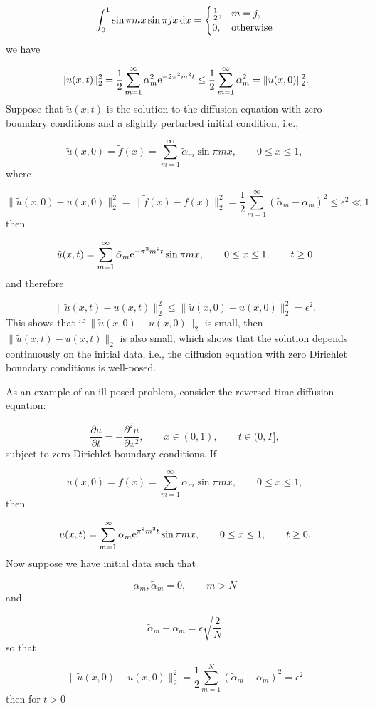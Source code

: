 \documentclass[12pt,landscape]{article}
\begin{document}
{\[
\int_0^1 \sin \pi m x \sin \pi j x\, {\rm d}x = \begin{cases}
\frac{1}{2}, & m  = j, \\
0, & \text{otherwise}
\end{cases}
\]
we have

\[
\|u(x,t)\|_2^2 =  \frac{1}{2}\sum_{m=1}^{\infty} \alpha_m^2 {\rm e}^{-2\pi^2 m^2 t} \leq \frac{1}{2}\sum_{m=1}^{\infty} \alpha_m^2 = \| u(x,0) \|_2^2.
\]
Suppose that $\tilde{u}(x,t)$ is the solution to the diffusion equation with zero boundary conditions and a slightly perturbed initial condition, i.e.,

\[
\tilde{u}(x,0) = \tilde{f}(x) = \sum_{m = 1}^{\infty}\tilde{\alpha}_m \sin \pi m x, \qquad 0 \leq x \leq 1,
\]
where

\[
\| \tilde{u}(x,0) - u(x,0) \|_2^2 = \| \tilde{f}(x) - f(x) \|_2^2 = \frac{1}{2}\sum_{m=1}^{\infty} \left(  \tilde{\alpha}_m -    \alpha_m  \right)^2   \leq \epsilon^2 \ll 1
\]
then

\[
\tilde{u}(x,t) = \sum_{m = 1}^{\infty}\tilde{\alpha}_m {\rm e}^{-\pi^2m^2 t} \sin \pi m x, \qquad 0 \leq x \leq 1, \qquad t \geq 0
\]
and therefore

\[
\|\tilde{u}(x,t) - u(x,t)\|_2^2   \leq  \| \tilde{u}(x,0) -  u(x,0) \|_2^2 = \epsilon^2.
\]
This shows that if $\| \tilde{u}(x,0) -  u(x,0) \|_2$ is small, then $\|\tilde{u}(x,t) - u(x,t)\|_2$ is also small, which shows that the solution depends continuously on the initial data, i.e., the diffusion equation with zero Dirichlet boundary conditions is well-posed.

As an example of an ill-posed problem, consider the reversed-time diffusion equation:

\[
\frac{\partial u}{\partial t}=-\frac{\partial^2 u}{\partial x^2}, \qquad x \in (0, 1),\qquad t \in (0, T],
\]
subject to zero Dirichlet boundary conditions. If

\[
u(x,0) = f(x) = \sum_{m = 1}^{\infty}\alpha_m \sin \pi m x, \qquad 0 \leq x \leq 1,
\]
then

\[
u(x,t) = \sum_{m = 1}^{\infty}\alpha_m {\rm e}^{\pi^2m^2 t} \sin \pi m x, \qquad 0 \leq x \leq 1, \qquad t \geq 0.
\]
Now suppose we have initial data such that

\[
\alpha_m, \tilde{\alpha}_m = 0, \qquad m > N
\]
and

\[
\tilde{\alpha}_m -    \alpha_m  = \epsilon\sqrt{\frac{2}{N}}
\]
so that

\[
\| \tilde{u}(x,0) - u(x,0) \|_2^2 = \frac{1}{2}\sum_{m=1}^{N} \left(  \tilde{\alpha}_m -    \alpha_m  \right)^2     = \epsilon^2
\]
then for $t > 0$

}
\end{document}
